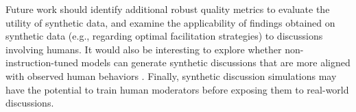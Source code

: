 %

Future work should identify additional robust quality metrics to evaluate the utility of synthetic data, and examine the applicability of findings obtained on synthetic data (e.g., regarding optimal facilitation strategies) to discussions involving humans. It would also be interesting to explore whether non-instruction-tuned models can generate synthetic discussions that are more aligned with observed human behaviors \cite{anthis_2025}. Finally, synthetic discussion simulations may have the potential to train human moderators before exposing them to real-world discussions.